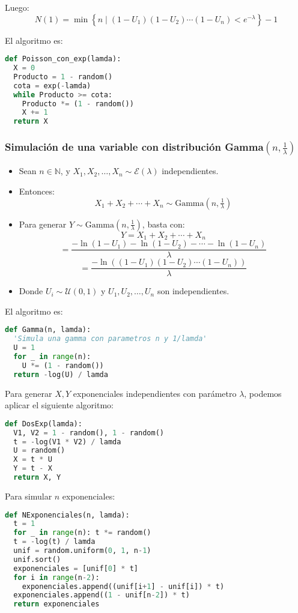 \documentclass[11pt, a4paper]{article}
\theoremstyle{definition}
\begin{document}
\bigskip

Luego:
\[
N(1) = \min\left\{n \mid (1 - U_1)(1 - U_2) \cdots (1 - U_n) < e^{-\lambda} \right\} - 1
\]

El algoritmo es:
\begin{lstlisting}[language=Python]
def Poisson_con_exp(lamda):
  X = 0
  Producto = 1 - random()
  cota = exp(-lamda)
  while Producto >= cota:
    Producto *= (1 - random())
    X += 1
  return X
\end{lstlisting}

\subsubsection{Simulación de una variable con distribución Gamma$(n, \frac{1}{\lambda})$}

\begin{itemize}
    \item Sean \(n \in \mathbb{N}\), y \(X_1, X_2, \ldots, X_n \sim \mathcal{E}(\lambda)\) independientes.
    
    \item Entonces:
    \[
    X_1 + X_2 + \cdots + X_n \sim \text{Gamma}\left(n, \tfrac{1}{\lambda}\right)
    \]
    
    \item Para generar \(Y \sim \text{Gamma}\left(n, \tfrac{1}{\lambda}\right)\), basta con:
    \[
    Y = X_1 + X_2 + \cdots + X_n
    \]
    \[
    = \frac{-\ln(1 - U_1) - \ln(1 - U_2) - \cdots - \ln(1 - U_n)}{\lambda}
    \]
    \[
    = \frac{-\ln\left((1 - U_1)(1 - U_2)\cdots(1 - U_n)\right)}{\lambda}
    \]
    
    \item Donde \(U_i \sim \mathcal{U}(0, 1)\) y \(U_1, U_2, \ldots, U_n\) son independientes.
\end{itemize}

El algoritmo es:
\begin{lstlisting}[language=Python]
def Gamma(n, lamda):
  'Simula una gamma con parametros n y 1/lamda'
  U = 1
  for _ in range(n):
    U *= (1 - random())
  return -log(U) / lamda
\end{lstlisting}
Para generar $X, Y$ exponenciales independientes con parámetro \(\lambda\), podemos aplicar el siguiente algoritmo:
\begin{lstlisting}[language=Python]
def DosExp(lamda):
  V1, V2 = 1 - random(), 1 - random()
  t = -log(V1 * V2) / lamda
  U = random()
  X = t * U
  Y = t - X
  return X, Y
\end{lstlisting}
Para simular $n$ exponenciales: 
\begin{lstlisting}[language=Python]
def NExponenciales(n, lamda):
  t = 1
  for _ in range(n): t *= random()
  t = -log(t) / lamda
  unif = random.uniform(0, 1, n-1)
  unif.sort()
  exponenciales = [unif[0] * t]
  for i in range(n-2):
    exponenciales.append((unif[i+1] - unif[i]) * t)
  exponenciales.append((1 - unif[n-2]) * t)
  return exponenciales
\end{lstlisting}
\end{document}
